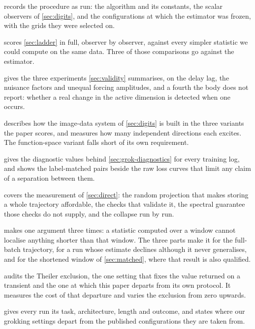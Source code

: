 \documentclass[twoside]{article}
\begin{document}
\textbf{} records the procedure as run: the algorithm and its constants, the
scalar observers of \cref{sec:digits}, and the configurations at which the estimator was frozen,
with the grids they were selected on.

\textbf{} scores \cref{sec:ladder} in full, observer by observer, against every
simpler statistic we could compute on the same data. Three of those comparisons go against the
estimator.

\textbf{} gives the three experiments \cref{sec:validity} summarises, on the delay lag, the nuisance factors and unequal
forcing amplitudes, and a fourth the body does not
report: whether a real change in the active dimension is detected when one occurs.

\textbf{} describes how the image-data system of \cref{sec:digits} is built
in the three variants the paper scores, and measures how many independent directions each excites.
The function-space variant falls short of its own requirement.

\textbf{} gives the diagnostic values behind \cref{sec:grok-diagnostics} for every
training log, and shows the label-matched pairs beside the raw loss curves that limit any claim
of a separation between them.

\textbf{} covers the measurement of \cref{sec:direct}: the random projection that
makes storing a whole trajectory affordable, the checks that validate it, the spectral guarantee
those checks do not supply, and the collapse run by run.

\textbf{} makes one argument three times: a statistic computed over a window
cannot localise anything shorter than that window. The three parts make it for the full-batch
trajectory, for a run whose estimate declines although it never generalises, and for the shortened
window of \cref{sec:matched}, where that result is also qualified.

\textbf{} audits the Theiler exclusion, the one setting that fixes the value
returned on a transient and the one at which this paper departs from its own protocol. It measures
the cost of that departure and varies the exclusion from zero upwards.

\textbf{} gives every run its task, architecture, length and outcome, and states
where our grokking settings depart from the published configurations they are taken from.
\end{document}
